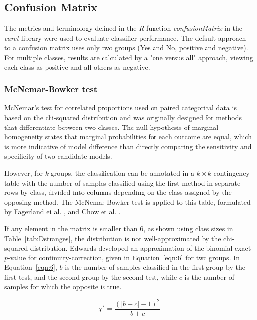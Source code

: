 \let\LaTeXcline\cline\documentclass[sn-mathphys-num]{sn-jnl}\let\cline\LaTeXcline
\begin{document}
\subsection{Confusion Matrix}

The metrics and terminology defined in the \textit{R} function \textit{confusionMatrix} in the \textit{caret} library \cite{Kuhn2007, kuhn2008building} were used to evaluate classifier performance. The default approach to a confusion matrix uses only two groups (Yes and No, positive and negative). For multiple classes, results are calculated by a "one versus all" approach, viewing each class as positive and all others as negative.

\subsubsection{McNemar-Bowker test}

McNemar’s test for correlated proportions used on paired categorical data is based on the chi-squared distribution and was originally designed for methods that differentiate between two classes. The null hypothesis of marginal homogeneity states that marginal probabilities for each outcome are equal, which is more indicative of model difference than directly comparing the sensitivity and specificity of two candidate models.

However, for $k$ groups, the classification can be annotated
in a $k \times k$ contingency table with the number of samples classified using the first method in separate rows by class, divided into columns depending on the class assigned by the opposing method. The McNemar-Bowker test is applied to this table, formulated by Fagerland et al. \cite{fagerland2017statistical}, and Chow et al. \cite{chow2018sample}.

If any element in the matrix is smaller than $6$, as shown using class sizes in Table~\ref{tab:Dstranges}, the distribution is not well-approximated by the chi-squared distribution. Edwards \cite{edwards1948note} developed an approximation of the binomial exact $p$-value for continuity-correction, given in Equation~\ref{eqn:6} for two groups. In Equation~\ref{eqn:6}, $b$ is the number of samples classified in the first group by the first test, and the second group by the second test, while $c$ is the number of samples for which the opposite is true.
 
\begin{equation}
    \chi^{2}=\frac{(|b-c|-1)^{2}}{b+c}
    \label{eqn:6}
\end{equation}
\end{document}
